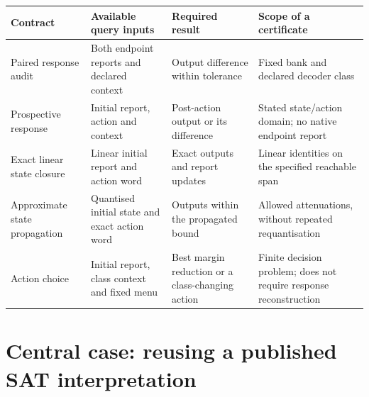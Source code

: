 \documentclass[
  british,
  11pt,
  a4paper,
]{article}
\newcounter{none} %
\begin{document}
{\def\LTcaptype{none} %
\begin{longtable}[]{@{}
  >{\raggedright\arraybackslash}p{}
  >{\raggedright\arraybackslash}p{}
  >{\raggedright\arraybackslash}p{}
  >{\raggedright\arraybackslash}p{}@{}}
\toprule\noalign{}
\begin{minipage}[b]{\linewidth}\raggedright
Contract
\end{minipage} & \begin{minipage}[b]{\linewidth}\raggedright
Available query inputs
\end{minipage} & \begin{minipage}[b]{\linewidth}\raggedright
Required result
\end{minipage} & \begin{minipage}[b]{\linewidth}\raggedright
Scope of a certificate
\end{minipage} \\
\midrule\noalign{}
\endhead
\bottomrule\noalign{}
\endlastfoot
Paired response audit & Both endpoint reports and declared context &
Output difference within tolerance & Fixed bank and declared decoder
class \\
Prospective response & Initial report, action and context & Post-action
output or its difference & Stated state/action domain; no native
endpoint report \\
Exact linear state closure & Linear initial report and action word &
Exact outputs and report updates & Linear identities on the specified
reachable span \\
Approximate state propagation & Quantised initial state and exact action
word & Outputs within the propagated bound & Allowed attenuations,
without repeated requantisation \\
Action choice & Initial report, class context and fixed menu & Best
margin reduction or a class-changing action & Finite decision problem;
does not require response reconstruction \\
\end{longtable}
}

\section{Central case: reusing a published SAT
interpretation}\label{central-case-reusing-a-published-sat-interpretation}
\end{document}
